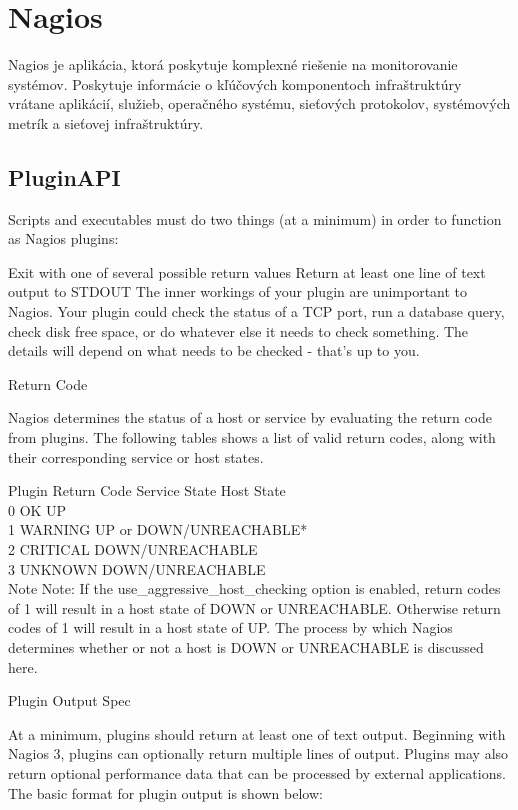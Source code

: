 \documentclass[11pt,final,oneside]{fithesis}
\begin{document}
\section{Nagios}
Nagios je aplikácia, ktorá poskytuje komplexné riešenie na monitorovanie systémov. Poskytuje informácie o kľúčových komponentoch infraštruktúry vrátane aplikácií, služieb, operačného systému, sieťových protokolov, systémových metrík
a sieťovej infraštruktúry. \cite{19}

\subsection{PluginAPI}
Scripts and executables must do two things (at a minimum) in order to function as Nagios plugins:

Exit with one of several possible return values
Return at least one line of text output to STDOUT
The inner workings of your plugin are unimportant to Nagios. Your plugin could check the status of a TCP port, run a database query, check disk free space, or do whatever else it needs to check something. The details will depend on what needs to be checked - that's up to you.

Return Code

Nagios determines the status of a host or service by evaluating the return code from plugins. The following tables shows a list of valid return codes, along with their corresponding service or host states.

Plugin Return Code	Service State	Host State
\\0	OK	UP
\\1	WARNING	UP or DOWN/UNREACHABLE*
\\2	CRITICAL	DOWN/UNREACHABLE
\\3	UNKNOWN	DOWN/UNREACHABLE
\\Note Note: If the use\_aggressive\_host\_checking option is enabled, return codes of 1 will result in a host state of DOWN or UNREACHABLE. Otherwise return codes of 1 will result in a host state of UP. The process by which Nagios determines whether or not a host is DOWN or UNREACHABLE is discussed here.

Plugin Output Spec

At a minimum, plugins should return at least one of text output. Beginning with Nagios 3, plugins can optionally return multiple lines of output. Plugins may also return optional performance data that can be processed by external applications. The basic format for plugin output is shown below:
\end{document}
